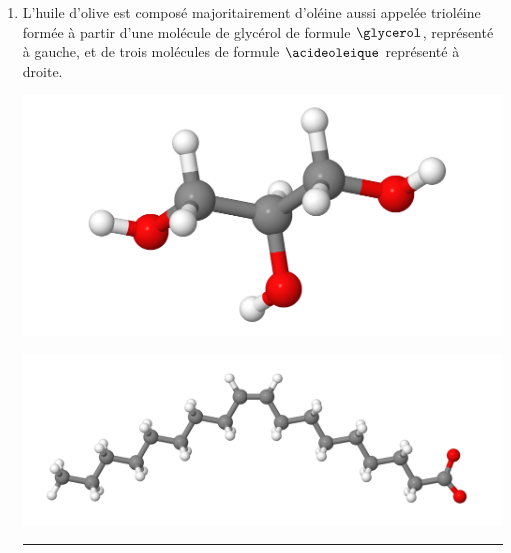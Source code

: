 \documentclass[12pt,a4paper]{article}
\begin{document}
\begin{enumerate}
\hrule{}
\vspace{5pt}
\item L'huile d'olive est composé majoritairement d'oléine aussi appelée trioléine formée à partir d'une molécule de glycérol de formule $\glycerol$, représenté à gauche, et de trois molécules de formule $\acideoleique$ représenté à droite.
\begin{multicols}{2}
\center
\includegraphics[scale=0.2]{images/glycerol.png}

\includegraphics[scale=0.2]{images/acide_oleique.png}
\end{multicols}

\hrule{}
\end{enumerate}
\end{document}
